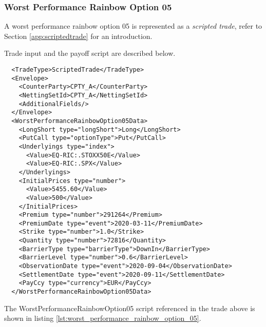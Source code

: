 \subsubsection*{Worst Performance Rainbow Option 05}

A worst performance rainbow option 05 is represented as a {\em scripted trade}, refer to Section \ref{app:scriptedtrade}
for an introduction.

Trade input and the payoff script are described below.

\begin{verbatim}
  <TradeType>ScriptedTrade</TradeType>
  <Envelope>
    <CounterParty>CPTY_A</CounterParty>
    <NettingSetId>CPTY_A</NettingSetId>
    <AdditionalFields/>
  </Envelope>
  <WorstPerformanceRainbowOption05Data>
    <LongShort type="longShort">Long</LongShort>
    <PutCall type="optionType">Put</PutCall>
    <Underlyings type="index">
      <Value>EQ-RIC:.STOXX50E</Value>
      <Value>EQ-RIC:.SPX</Value>
    </Underlyings>
    <InitialPrices type="number">
      <Value>5455.60</Value>
      <Value>500</Value>
    </InitialPrices>
    <Premium type="number">291264</Premium>
    <PremiumDate type="event">2020-03-11</PremiumDate>
    <Strike type="number">1.0</Strike>
    <Quantity type="number">72816</Quantity>
    <BarrierType type="barrierType">DownIn</BarrierType>
    <BarrierLevel type="number">0.6</BarrierLevel>
    <ObservationDate type="event">2020-09-04</ObservationDate>
    <SettlementDate type="event">2020-09-11</SettlementDate>
    <PayCcy type="currency">EUR</PayCcy>
  </WorstPerformanceRainbowOption05Data>
\end{verbatim}

The WorstPerformanceRainbowOption05 script referenced in the trade above is shown in listing
\ref{lst:worst_performance_rainbow_option_05}.

